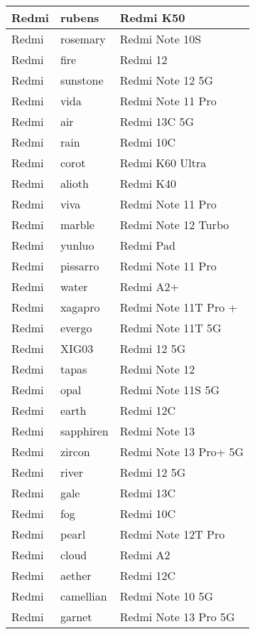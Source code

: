 \begin{tabularx}{\linewidth}{|l|X|X|}
        Redmi & rubens & Redmi K50 \\ \hline
        Redmi & rosemary & Redmi Note 10S \\ \hline
        Redmi & fire & Redmi 12 \\ \hline
        Redmi & sunstone & Redmi Note 12 5G \\ \hline
        Redmi & vida & Redmi Note 11 Pro \\ \hline
        Redmi & air & Redmi 13C 5G \\ \hline
        Redmi & rain & Redmi 10C \\ \hline
        Redmi & corot & Redmi K60 Ultra \\ \hline
        Redmi & alioth & Redmi K40 \\ \hline
        Redmi & viva & Redmi Note 11 Pro \\ \hline
        Redmi & marble & Redmi Note 12 Turbo \\ \hline
        Redmi & yunluo & Redmi Pad \\ \hline
        Redmi & pissarro & Redmi Note 11 Pro \\ \hline
        Redmi & water & Redmi A2+ \\ \hline
        Redmi & xagapro & Redmi Note 11T Pro + \\ \hline
        Redmi & evergo & Redmi Note 11T 5G \\ \hline
        Redmi & XIG03 & Redmi 12 5G \\ \hline
        Redmi & tapas & Redmi Note 12 \\ \hline
        Redmi & opal & Redmi Note 11S 5G \\ \hline
        Redmi & earth & Redmi 12C \\ \hline
        Redmi & sapphiren & Redmi Note 13 \\ \hline
        Redmi & zircon & Redmi Note 13 Pro+ 5G \\ \hline
        Redmi & river & Redmi 12 5G \\ \hline
        Redmi & gale & Redmi 13C \\ \hline
        Redmi & fog & Redmi 10C \\ \hline
        Redmi & pearl & Redmi Note 12T Pro \\ \hline
        Redmi & cloud & Redmi A2 \\ \hline
        Redmi & aether & Redmi 12C \\ \hline
        Redmi & camellian & Redmi Note 10 5G \\ \hline
        Redmi & garnet & Redmi Note 13 Pro 5G \\ \hline

\end{tabularx}
